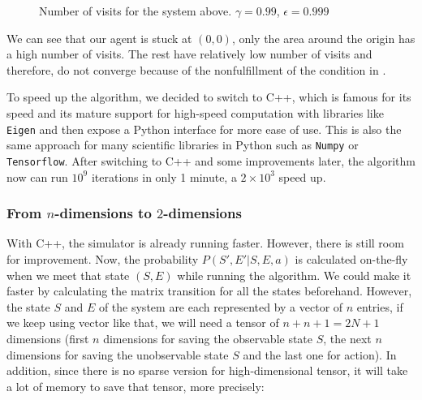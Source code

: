 \documentclass[
  a4paper, xcolor = usenames,dvipsnames]{article}
\newcommand{\passthrough}[1]{#1}
\theoremstyle{definition}
\theoremstyle{definition}
\theoremstyle{definition}
\theoremstyle{definition}
\theoremstyle{remark}
\begin{document}
\begin{figure}

{\centering {}

}

\caption{Number of visits for the system above. $\gamma = 0.99$, $\epsilon = 0.999$}\label{fig:10x10-python-n-visit}
\end{figure}

We can see that our agent is stuck at \((0, 0)\), only the area around the origin has a high number of visits. The rest have relatively low number of visits and therefore, do not converge because of the nonfulfillment of the condition in \autocite{q-learning-converge}.

To speed up the algorithm, we decided to switch to C++, which is famous for its speed and its mature support for high-speed computation with libraries like \passthrough{\lstinline!Eigen!} and then expose a Python interface for more ease of use. This is also the same approach for many scientific libraries in Python such as \passthrough{\lstinline!Numpy!} or \passthrough{\lstinline!Tensorflow!}. After switching to C++ and some improvements later, the algorithm now can run \(10^9\) iterations in only 1 minute, a \(2 \times 10^3\) speed up.

\hypertarget{from-n-dimensions-to-2-dimensions}{%
\subsubsection{\texorpdfstring{From \(n\)-dimensions to \(2\)-dimensions}{From n-dimensions to 2-dimensions}}\label{from-n-dimensions-to-2-dimensions}}

With C++, the simulator is already running faster. However, there is still room for improvement. Now, the probability \(P(S', E' | S, E, a)\) is calculated on-the-fly when we meet that state \((S, E)\) while running the algorithm. We could make it faster by calculating the matrix transition for all the states beforehand. However, the state \(S\) and \(E\) of the system are each represented by a vector of \(n\) entries, if we keep using vector like that, we will need a tensor of \(n + n + 1 = 2N + 1\) dimensions (first \(n\) dimensions for saving the observable state \(S\), the next \(n\) dimensions for saving the unobservable state \(S\) and the last one for action). In addition, since there is no sparse version for high-dimensional tensor, it will take a lot of memory to save that tensor, more precisely:
\end{document}
